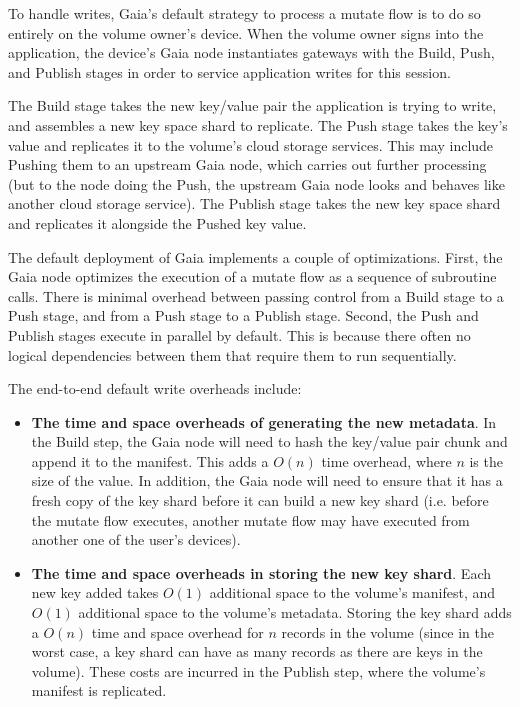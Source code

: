To handle writes, Gaia's default strategy to process a
mutate flow is to do so entirely on the volume owner's device.  When the volume
owner signs into the application, the device's Gaia node instantiates gateways with the Build,
Push, and Publish stages in order to service application writes for this session.

The Build stage takes the new key/value pair the application is trying to write,
and assembles a new key space shard to replicate.  The Push stage takes the
key's value and replicates it to the volume's cloud storage
services.  This may include Pushing them to an upstream Gaia node, which carries
out further processing (but to the node doing the Push, the upstream Gaia node
looks and behaves like another cloud storage service).  The Publish stage takes
the new key space shard and replicates it alongside the Pushed key value.

The default deployment of Gaia implements a couple of optimizations.
First, the Gaia node optimizes the execution of a mutate flow as a sequence
of subroutine calls.  There is minimal overhead between passing control from a
Build stage to a Push stage, and from a Push stage to a Publish stage.
Second, the Push and Publish stages execute in parallel by default.  This is
because there often no logical dependencies between them that require them
to run sequentially.

The end-to-end default write overheads include:

\begin{itemize}
\item \textbf{The time and space overheads of generating the new metadata}.  In
the Build step, the Gaia node will need to hash the key/value pair
chunk and append it to the manifest.  This adds a $O(n)$ time overhead, where
$n$ is the size of the value.  In addition, the Gaia node will need to ensure
that it has a fresh copy of the key shard before it can build a new key
shard (i.e. before the mutate flow executes, another mutate flow may have
executed from another one of the user's devices).
\item \textbf{The time and space overheads in storing the new key shard}.  Each new
key added takes $O(1)$ additional space to the volume's manifest, and $O(1)$
additional space to the volume's metadata.
Storing the key shard adds a $O(n)$ time and space overhead for $n$ records in the volume
(since in the worst case, a key shard can have as many records as there are
keys in the volume).  These costs are incurred in the Publish step, where the
volume's manifest is replicated.
\end{itemize}

